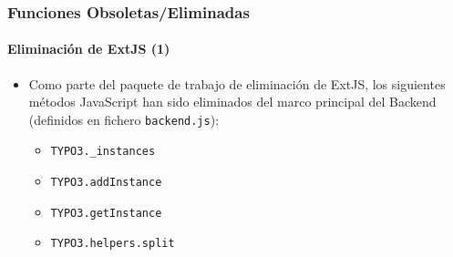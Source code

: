 \begin{frame}[fragile]
	\frametitle{Funciones Obsoletas/Eliminadas}
	\framesubtitle{Eliminación de ExtJS (1)}

	\begin{itemize}
		\item Como parte del paquete de trabajo de eliminación de ExtJS, los siguientes métodos JavaScript han sido eliminados
			del marco principal del Backend (definidos en fichero \texttt{backend.js}):

		\begin{itemize}
			\item \texttt{TYPO3.\_instances}
			\item \texttt{TYPO3.addInstance}
			\item \texttt{TYPO3.getInstance}
			\item \texttt{TYPO3.helpers.split}
		\end{itemize}

	\end{itemize}

\end{frame}
